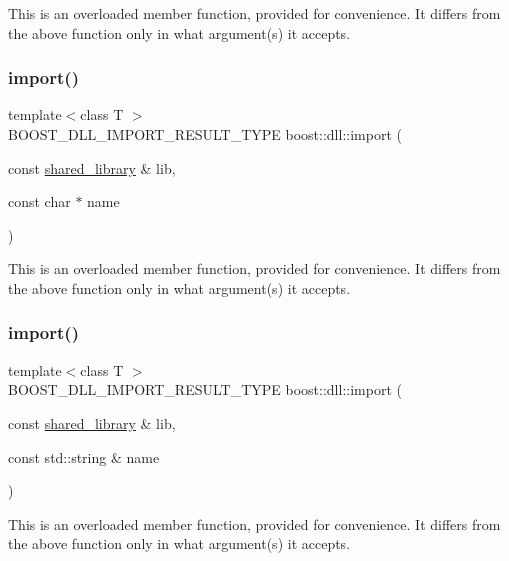 This is an overloaded member function, provided for convenience. It differs from the above function only in what argument(s) it accepts. \mbox{\label{a00254_file_a1feb1943049297f6177c9e80d1f96202}} 
\subsubsection{\texorpdfstring{import()}{import()}\hspace{0.1cm}{\footnotesize\ttfamily [3/6]}}
{\footnotesize\ttfamily template$<$class T $>$ \\
B\+O\+O\+S\+T\+\_\+\+D\+L\+L\+\_\+\+I\+M\+P\+O\+R\+T\+\_\+\+R\+E\+S\+U\+L\+T\+\_\+\+T\+Y\+PE boost\+::dll\+::import (\begin{DoxyParamCaption}\item[{const \hyperlink{a01708}{shared\+\_\+library} \&}]{lib,  }\item[{const char $\ast$}]{name }\end{DoxyParamCaption})}

This is an overloaded member function, provided for convenience. It differs from the above function only in what argument(s) it accepts. \mbox{\label{a00254_file_a7697764076cbe4d8e7705b2a4710c76f}} 
\subsubsection{\texorpdfstring{import()}{import()}\hspace{0.1cm}{\footnotesize\ttfamily [4/6]}}
{\footnotesize\ttfamily template$<$class T $>$ \\
B\+O\+O\+S\+T\+\_\+\+D\+L\+L\+\_\+\+I\+M\+P\+O\+R\+T\+\_\+\+R\+E\+S\+U\+L\+T\+\_\+\+T\+Y\+PE boost\+::dll\+::import (\begin{DoxyParamCaption}\item[{const \hyperlink{a01708}{shared\+\_\+library} \&}]{lib,  }\item[{const std\+::string \&}]{name }\end{DoxyParamCaption})}

This is an overloaded member function, provided for convenience. It differs from the above function only in what argument(s) it accepts. \mbox{\label{a00254_file_a6008e873f45aa7cc22b8d556670a6b85}} 
